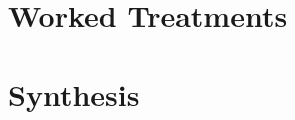 \documentclass[11pt,a4paper,openany]{book}
\theoremstyle{cleanrm}
\begin{document}

\part{Worked Treatments}


\part{Synthesis}


\backmatter
% 
% 
\end{document}
